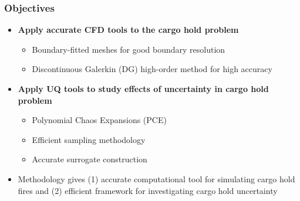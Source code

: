 \documentclass[9pt]{beamer}
\begin{document}
\begin{frame}
\frametitle{Objectives}
\label{sec-5-7}

\begin{itemize}
\item \textbf{Apply accurate CFD tools to the cargo hold problem}
\begin{itemize}
\item Boundary-fitted meshes for good boundary resolution
\item Discontinuous Galerkin (DG) high-order method for high accuracy
\end{itemize}
\item \textbf{Apply UQ tools to study effects of uncertainty in cargo hold problem}
\begin{itemize}
\item Polynomial Chaos Expansions (PCE)
\item Efficient sampling methodology
\item Accurate surrogate construction
\end{itemize}
\item Methodology gives (1) accurate computational tool for simulating
  cargo hold fires and (2) efficient framework for investigating cargo
  hold uncertainty
\end{itemize}
\end{frame}
\end{document}
